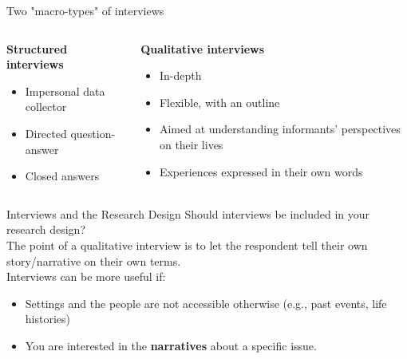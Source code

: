 \documentclass[10pt, aspectratio=169]{beamer}
\begin{document}


\begin{frame}{Two "macro-types" of interviews}
    \begin{columns}[T]
        \begin{column}{0.5\textwidth}
            \textbf{Structured interviews}
            \begin{itemize}
                \item Impersonal data collector\vspace{0.3cm}
                \item Directed question-answer\vspace{0.3cm}
                \item Closed answers\vspace{0.3cm}
            \end{itemize}
        \end{column}
        \begin{column}{0.5\textwidth}
            \textbf{Qualitative interviews}
            \begin{itemize}
                \item In-depth\vspace{0.3cm}
                \item Flexible, with an outline\vspace{0.3cm}
                \item Aimed at understanding informants’ perspectives on their lives \vspace{0.3cm}
                \item Experiences expressed in their own words
            \end{itemize}
        \end{column}
    \end{columns}
\end{frame}

\begin{frame}{Interviews and the Research Design}
Should interviews be included in your research design? \\ \vspace{0.3cm}
The point of a qualitative interview is to let the respondent tell their own story/narrative on their own terms. \\\vspace{0.3cm}
Interviews can be more useful if:
\begin{itemize}
\item Settings and the people are not accessible otherwise (e.g., past events, life histories) \vspace{0.3cm}
\item You are interested in the \textbf{narratives} about a specific issue.
\end{itemize}
\end{frame}
\end{document}
